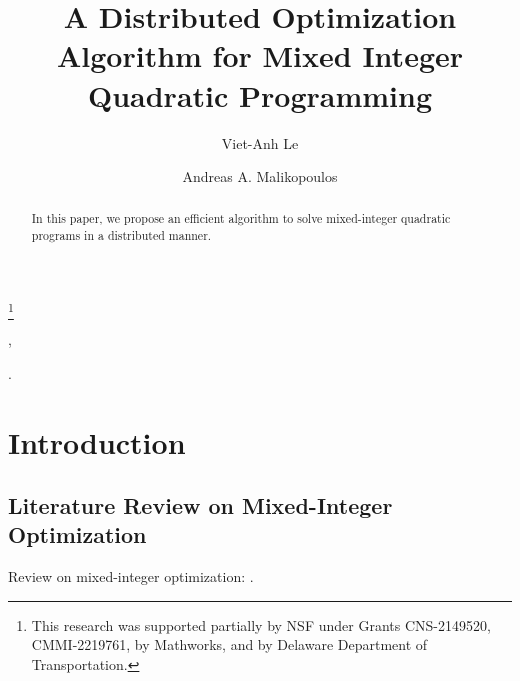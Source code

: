 \documentclass[twocolumn,amsthm]{autart}%
\theoremstyle{definition}
\theoremstyle{plain}
\begin{document}
\begin{frontmatter}
\title{A Distributed Optimization Algorithm for Mixed Integer Quadratic Programming} %
\thanks[footnoteinfo]{This research was supported partially by NSF under Grants CNS-2149520, CMMI-2219761, by Mathworks, and by Delaware Department of Transportation.}

\author[UD,SY]{Viet-Anh Le},
\author[CEE]{Andreas A. Malikopoulos}


\address[UD]{Department of Mechanical Engineering, University of Delaware, Newark, DE 19716 USA}
\address[SY]{Systems Engineering Field, Cornell University, Ithaca, NY 14850 USA}
\address[CEE]{School of Civil and Environmental Engineering, Cornell University, Ithaca, NY 14853 USA}

\begin{keyword}                           %
.
\end{keyword}                             %


\begin{abstract}

In this paper, we propose an efficient algorithm to solve mixed-integer quadratic programs in a distributed manner.

\end{abstract}

\end{frontmatter}


\section{Introduction}

\subsection{Literature Review on Mixed-Integer Optimization}

Review on mixed-integer optimization: \cite[Sec. 5.2]{ioan2021mixed}.
\end{document}
